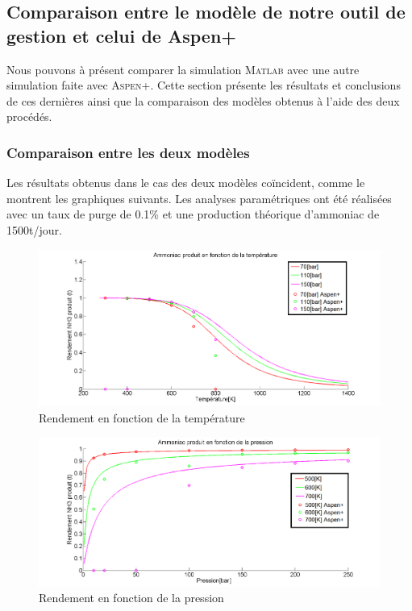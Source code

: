 
\subsection{Comparaison entre le modèle de notre outil de gestion et celui de Aspen+}
Nous pouvons à présent comparer la simulation \textsc{Matlab} avec une autre
simulation faite avec \textsc{Aspen+}. Cette section présente les résultats et conclusions de ces dernières ainsi que la comparaison des modèles obtenus à l'aide des deux procédés.
\subsubsection{Comparaison entre les deux modèles}
Les résultats obtenus dans le cas des deux modèles coïncident, comme le montrent les graphiques suivants. Les analyses paramétriques ont été réalisées avec un taux de purge de 0.1\% et une production théorique d'ammoniac de \unit{1500}{t/jour}.
\begin{figure}[ht!]
\centering
\includegraphics[scale=0.35]{GrapheCompT.png}
\caption{Rendement en fonction de la température}
\label{scheme1}
\end{figure}
\begin{figure}[ht!]
\centering
\includegraphics[scale=0.35]{GrapheCompP.png}
\caption{Rendement en fonction de la pression}
\label{scheme2}
\end{figure}
